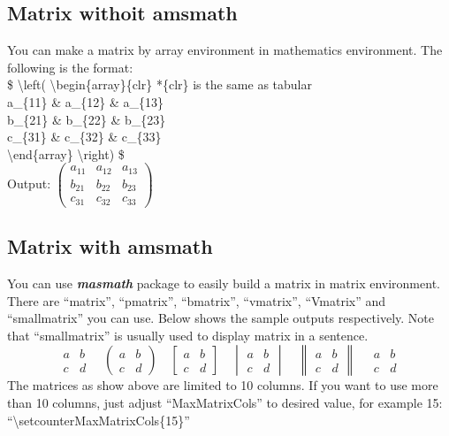 \documentclass[10pt,a4paper,fleqn]{article}
\def\bslash{\textbackslash} %
\begin{document}
\subsection{Matrix withoit amsmath}%
You can make a matrix by array environment in mathematics environment. The following is the format:\\
\$ \bslash left( 
\bslash begin\{array\}\{clr\} {\scriptsize { *\{clr\} is the same as tabular}}\\
	a\_\{11\} \& a\_\{12\} \& a\_\{13\}\\
	b\_\{21\} \& b\_\{22\} \& b\_\{23\}\\
	c\_\{31\} \& c\_\{32\} \& c\_\{33\}\\
\bslash end\{array\} \bslash right) \$ \\ %
Output:
$  \left( 
\begin{array}{clr} 
	a_{11} & a_{12} & a_{13}\\
	b_{21} & b_{22} & b_{23}\\
	c_{31} & c_{32} & c_{33}
\end{array} \right) $ 

\subsection{Matrix with amsmath} %
You can use \textit{\textbf{masmath}} package to easily build a matrix in matrix environment. There are ``matrix'', ``pmatrix'', ``bmatrix'', ``vmatrix'', ``Vmatrix'' and ``smallmatrix'' you can use. Below shows the sample outputs respectively. Note that ``smallmatrix'' is usually used to display matrix in a sentence.
$$
\begin{matrix} 
a & b \\
c & d 
\end{matrix} 
\quad
\begin{pmatrix}  
a & b \\
c & d 
\end{pmatrix}
\quad
\begin{bmatrix} 
a & b \\
c & d 
\end{bmatrix}
\quad
\begin{vmatrix} 
a & b \\
c & d 
\end{vmatrix}
\quad
\begin{Vmatrix} 
a & b \\
c & d 
\end{Vmatrix}
\quad
\begin{smallmatrix}  
  a&b\\
  c&d
\end{smallmatrix} 
$$
The matrices as show above are limited to 10 columns. If you want to use more than 10 columns, just adjust ``MaxMatrixCols'' to desired value, for example 15:
``\bslash setcounter{MaxMatrixCols}\{15\}''
\end{document}
